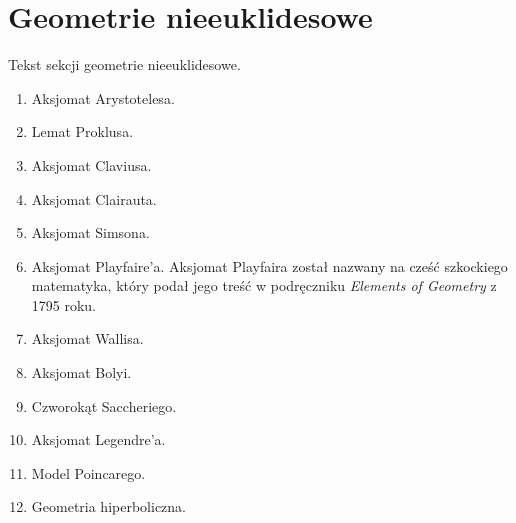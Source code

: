 %

\chapter{Geometrie nieeuklidesowe}
Tekst sekcji geometrie nieeuklidesowe.
\begin{enumerate}
	\item Aksjomat Arystotelesa.
	\item Lemat Proklusa.
	\item Aksjomat Claviusa.
	\item Aksjomat Clairauta.
	\item Aksjomat Simsona.
	\item Aksjomat Playfaire'a.
	Aksjomat Playfaira został nazwany na cześć szkockiego matematyka, który podał jego treść w podręczniku \emph{Elements of Geometry} z 1795 roku.
%
%
	\item Aksjomat Wallisa.
	\item Aksjomat Bolyi.
	\item Czworokąt Saccheriego.
	\item Aksjomat Legendre'a.
	\item Model Poincarego.
	\item Geometria hiperboliczna.
\end{enumerate}

%